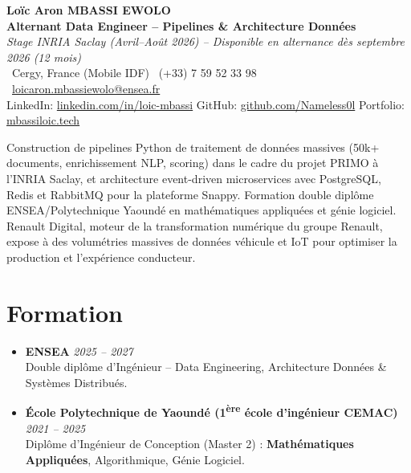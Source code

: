 \documentclass[a4paper,11pt]{article}
\begin{document}
\begin{center}
    {\Large \textbf{Lo\"ic Aron MBASSI EWOLO}} \\ \vspace{4pt}
    \textbf{\large Alternant Data Engineer -- Pipelines \& Architecture Donn\'ees} \\
    \textit{\small Stage INRIA Saclay (Avril--Ao\^ut 2026) -- Disponible en alternance d\`es septembre 2026 (12 mois)} \\ \vspace{4pt}
    \small
    \Pointinghand\ Cergy, France (Mobile IDF) \quad \Mobilefone\ (+33) 7 59 52 33 98 \quad
    {\color{primary}\Letter\ \href{mailto:loicaron.mbassiewolo@ensea.fr}{loicaron.mbassiewolo@ensea.fr}} \\ \vspace{2pt}
    {\color{primary}LinkedIn: \href{https://www.linkedin.com/in/loic-mbassi/}{linkedin.com/in/loic-mbassi}} \quad
    {\color{primary}GitHub: \href{https://github.com/Nameless0l}{github.com/Nameless0l}} \quad
    {\color{primary}Portfolio: \href{https://mbassiloic.tech}{mbassiloic.tech}}
\end{center}
\vspace{-6pt}
\noindent\small{Construction de pipelines Python de traitement de donn\'ees massives (50k+ documents, enrichissement NLP, scoring) dans le cadre du projet PRIMO \`a l'INRIA Saclay, et architecture event-driven microservices avec PostgreSQL, Redis et RabbitMQ pour la plateforme Snappy. Formation double dipl\^ome ENSEA/Polytechnique Yaound\'e en math\'ematiques appliqu\'ees et g\'enie logiciel. Renault Digital, moteur de la transformation num\'erique du groupe Renault, expose \`a des volum\'etries massives de donn\'ees v\'ehicule et IoT pour optimiser la production et l'exp\'erience conducteur.}

\section{Formation}
\begin{itemize}[leftmargin=*, label=\tiny$\bullet$, nosep]
    \item \textbf{ENSEA} \hfill \textit{2025 -- 2027} \\
    \small{Double dipl\^ome d'Ing\'enieur -- Data Engineering, Architecture Donn\'ees \& Syst\`emes Distribu\'es.}
    \item \textbf{\'Ecole Polytechnique de Yaound\'e (1\textsuperscript{\`ere} \'ecole d'ing\'enieur CEMAC)} \hfill \textit{2021 -- 2025} \\
    \small{Dipl\^ome d'Ing\'enieur de Conception (Master 2) : \textbf{Math\'ematiques Appliqu\'ees}, Algorithmique, G\'enie Logiciel.}
\end{itemize}
\end{document}
